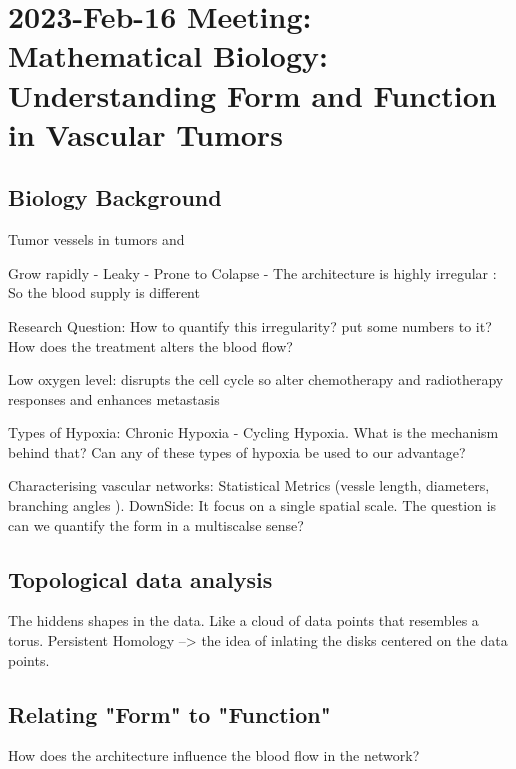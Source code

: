 \section{2023-Feb-16 Meeting: Mathematical Biology: Understanding Form and Function in Vascular Tumors}



\subsection{Biology Background}
Tumor vessels in tumors and 

Grow rapidly - Leaky - Prone to Colapse - The architecture is highly irregular : So the blood supply is different


Research Question: How to quantify this irregularity? put some numbers to it? How does the treatment alters the blood flow?

Low oxygen level: disrupts the cell cycle so alter chemotherapy and radiotherapy responses and enhances metastasis

Types of Hypoxia: Chronic Hypoxia - Cycling Hypoxia. What is the mechanism behind that? Can any of these types of hypoxia be used to our advantage?

Characterising vascular networks: Statistical Metrics (vessle length, diameters, branching angles ). DownSide: It focus on a single spatial scale. The question is can we quantify the form in a multiscalse sense?



\subsection{Topological data analysis}
The hiddens shapes in the data. Like a cloud of data points that resembles a torus. Persistent Homology --> the idea of inlating the disks centered on the data points.


\subsection{Relating "Form" to "Function"}
How does the architecture influence the blood flow in the network?


